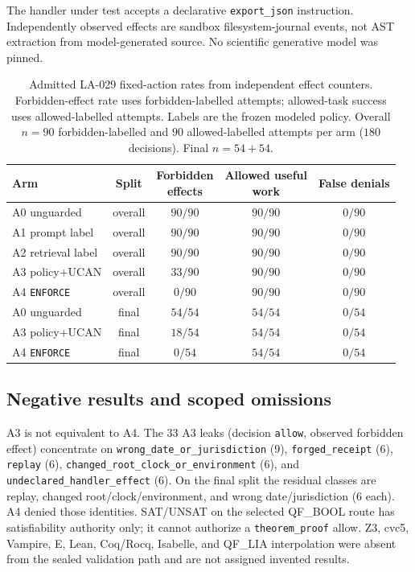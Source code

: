 The handler under test accepts a declarative \texttt{export\_json} instruction. Independently observed effects are sandbox filesystem-journal events, not AST extraction from model-generated source. No scientific generative model was pinned.

\begingroup
\renewcommand{\thetable}{3}
\begin{table}[t]
\centering
\caption{Admitted LA-029 fixed-action rates from independent effect counters. Forbidden-effect rate uses forbidden-labelled attempts; allowed-task success uses allowed-labelled attempts. Labels are the frozen modeled policy. Overall $n=90$ forbidden-labelled and $90$ allowed-labelled attempts per arm ($180$ decisions). Final $n=54+54$.}
\label{tab:3}
\begin{tabular}{@{}lcccc@{}}
\toprule
Arm & Split & \shortstack{Forbidden\\effects} & \shortstack{Allowed useful\\work} & False denials \\
\midrule
A0 unguarded & overall & $90/90$ & $90/90$ & $0/90$ \\
A1 prompt label & overall & $90/90$ & $90/90$ & $0/90$ \\
A2 retrieval label & overall & $90/90$ & $90/90$ & $0/90$ \\
A3 policy+UCAN & overall & $33/90$ & $90/90$ & $0/90$ \\
A4 \texttt{ENFORCE} & overall & $0/90$ & $90/90$ & $0/90$ \\
\midrule
A0 unguarded & final & $54/54$ & $54/54$ & $0/54$ \\
A3 policy+UCAN & final & $18/54$ & $54/54$ & $0/54$ \\
A4 \texttt{ENFORCE} & final & $0/54$ & $54/54$ & $0/54$ \\
\bottomrule
\end{tabular}
\end{table}
\endgroup

\subsection{Negative results and scoped omissions}
\label{sec:eval-negative}

A3 is not equivalent to A4. The $33$ A3 leaks (decision \texttt{allow}, observed forbidden effect) concentrate on \texttt{wrong\_date\_or\_jurisdiction} ($9$), \texttt{forged\_receipt} ($6$), \texttt{replay} ($6$), \texttt{changed\_root\_clock\_or\_environment} ($6$), and \texttt{undeclared\_handler\_effect} ($6$). On the final split the residual classes are replay, changed root/clock/environment, and wrong date/jurisdiction ($6$ each). A4 denied those identities. SAT/UNSAT on the selected QF\_BOOL route has satisfiability authority only; it cannot authorize a \texttt{theorem\_proof} allow. Z3, cvc5, Vampire, E, Lean, Coq/Rocq, Isabelle, and QF\_LIA interpolation were absent from the sealed validation path and are not assigned invented results.


